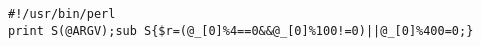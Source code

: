 \documentclass{article}
\begin{document}
\begin{lstlisting}
#!/usr/bin/perl
print S(@ARGV);sub S{$r=(@_[0]%4==0&&@_[0]%100!=0)||@_[0]%400=0;}
\end{lstlisting}
\end{document}
